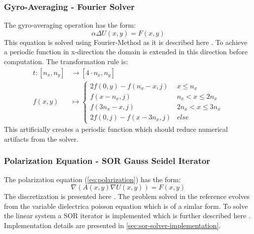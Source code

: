 \documentclass[master.tex]{subfiles}
\begin{document}
\subsubsection{Gyro-Averaging - Fourier Solver}
The gyro-averaging operation has the form:
\begin{equation}
    \alpha \Delta U(x, y) = F(x, y)
\end{equation}
This equation is solved using Fourier-Method as it is described here \cite{fft-poisson}. To achieve a periodic function in x-direction the domain is extended in this direction before computation. The transformation rule is:
\begin{equation}
\label{eq:gyro-transformation}
\begin{split}
    t\colon [n_x, n_y] & \to [4 \cdot n_x, n_y]\\
    f(x, y) &\mapsto \begin{cases}
    2 f(0, y) - f(n_x - x, j) & x \leq n_x\\
    f(x - n_x, j) & n_x < x \leq 2n_x\\
    f(3n_x-x,j) & 2n_x < x \leq 3n_x \\
    2 f(0, j) - f(x - 3n_x, j) & else
    \end{cases}
\end{split}
\end{equation}
This artificially creates a periodic function which should reduce numerical artifacts from the solver.

\subsubsection{Polarization Equation - \ac{SOR} Gauss Seidel Iterator} \label{sec:polarization-equation}
The polarization equation (\autoref{eq:polarization}) has the form:
\begin{equation}
    \nabla\left( A(x, y) \nabla U(x, y)\right) = F(x, y)
\end{equation}
The discretization is presented here \cite{DielectricPoisson}. The problem solved in the reference evolves from the variable dielectrica poisson equation which is of a simlar form. To solve the linear system a \ac{SOR} iterator is implemented which is further described here \cite{SORPaper}. Implementation details are presented in \autoref{sec:sor-solver-implementation}.
\end{document}
